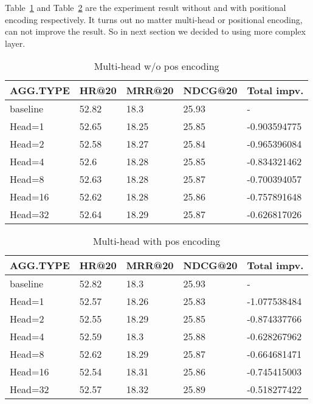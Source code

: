 \documentclass{article}
\begin{document}
Table~\ref{Multi-head w/o pos encoding} and Table~\ref{Multi-head with pos encoding}
are the experiment result without and with positional encoding respectively.
It turns out no matter multi-head or positional encoding, can not improve the result.
So in next section we decided to using more complex layer.

\begin{table}
    \caption{Multi-head w/o pos encoding}
    \label{Multi-head w/o pos encoding}
    \centering
    \begin{tabular}{lllll}
        \toprule
        AGG.TYPE & HR@20 & MRR@20 & NDCG@20 & Total impv.  \\
        \midrule
        baseline & 52.82 & 18.3   & 25.93   & -            \\
        Head=1   & 52.65 & 18.25  & 25.85   & -0.903594775 \\
        Head=2   & 52.58 & 18.27  & 25.84   & -0.965396084 \\
        Head=4   & 52.6  & 18.28  & 25.85   & -0.834321462 \\
        Head=8   & 52.63 & 18.28  & 25.87   & -0.700394057 \\
        Head=16  & 52.62 & 18.28  & 25.86   & -0.757891648 \\
        Head=32  & 52.64 & 18.29  & 25.87   & -0.626817026 \\
        \bottomrule
    \end{tabular}
\end{table}

\begin{table}
    \caption{Multi-head with pos encoding}
    \label{Multi-head with pos encoding}
    \centering
    \begin{tabular}{lllll}
        \toprule
        AGG.TYPE & HR@20 & MRR@20 & NDCG@20 & Total impv.  \\
        \midrule
        baseline & 52.82 & 18.3   & 25.93   & -            \\
        Head=1   & 52.57 & 18.26  & 25.83   & -1.077538484 \\
        Head=2   & 52.55 & 18.29  & 25.85   & -0.874337766 \\
        Head=4   & 52.59 & 18.3   & 25.88   & -0.628267962 \\
        Head=8   & 52.62 & 18.29  & 25.87   & -0.664681471 \\
        Head=16  & 52.54 & 18.31  & 25.86   & -0.745415003 \\
        Head=32  & 52.57 & 18.32  & 25.89   & -0.518277422 \\
        \bottomrule
    \end{tabular}
\end{table}
\end{document}

